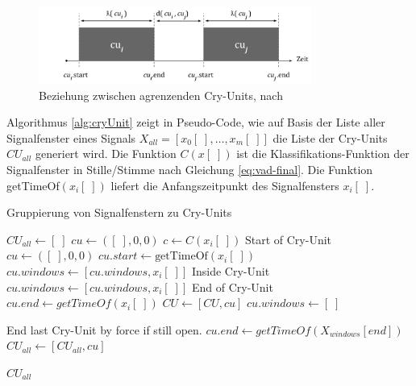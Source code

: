 \begin{figure}[h]
	\centering
	\includegraphics[width=0.8\textwidth]{bilder/newSmoothing05.png}
	\caption{Beziehung zwischen agrenzenden Cry-Units, nach \cite[S. 2]{vad_entropy}}
	\label{img:cryUnit-details}
\end{figure}

Algorithmus \ref{alg:cryUnit} zeigt in Pseudo-Code, wie auf Basis der Liste aller Signalfenster eines Signals $X_{all} = [x_0[\;] ,\ldots, x_m[\;]]$ die Liste der Cry-Units $CU_{all}$ generiert wird. Die Funktion $C(x[\;])$ ist die Klassifikations-Funktion der Signalfenster in Stille/Stimme nach Gleichung \ref{eq:vad-final}. Die Funktion getTimeOf$(x_i[\;])$ liefert die Anfangszeitpunkt des Signalfensters $x_i[\;]$.

\begin{algorithm}[h]
	\caption{Gruppierung von Signalfenstern zu Cry-Units}
	\label{alg:cryUnit}
	\begin{algorithmic}[1]
		\State $ CU_{all} \gets [\;]$
		\State $ cu\gets ([\;],0,0)$
				\State $ c \gets C(x_i[\;])$
				\State \Comment Start of Cry-Unit
						\State $cu\gets ([\;],0,0)$
						\State $cu.start \gets \text{getTimeOf}(x_i[\;])$
						\State $cu.windows \gets [cu.windows, x_i[\;]]$
				\EndIf
				\State \Comment Inside Cry-Unit
						\State $cu.windows \gets [cu.windows, x_i[\;]]$
				\EndIf
				\State \Comment End of Cry-Unit
						\State $cu.end \gets  getTimeOf(x_i[\;])$
						\State $CU \gets [CU, cu]$
						\State $cu.windows \gets [\;]$
				\EndIf
		\EndFor
		
		\State \Comment End last Cry-Unit by force if still open.
		\State $cu.end \gets  getTimeOf(X_{windows}[end])$
		\State $CU_{all} \gets [CU_{all}, cu]$
		\EndIf
		
		\Return $CU_{all}$
		
		\EndFunction
		
	\end{algorithmic}
\end{algorithm}

